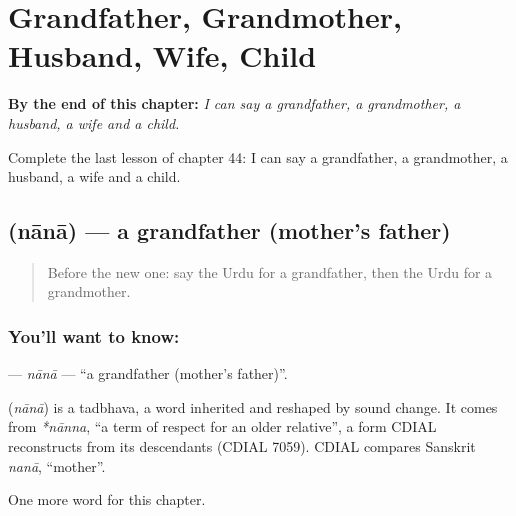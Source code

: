 
\chapter{Grandfather, Grandmother, Husband, Wife, Child}
\label{ch:ur-grandfather-grandmother-husband-wife-child}

\begin{chapteropening}
\textbf{By the end of this chapter:} \emph{I can say a grandfather, a grandmother, a husband, a wife and a child.}

Complete the last lesson of chapter 44: I can say a grandfather, a grandmother, a husband, a wife and a child.
\end{chapteropening}

\section[\texorpdfstring{\ur{نانا} (nānā)}{نانا (nānā)}]{ (nānā) — a grandfather (mother's father)}

\label{lesson:UR-C44-nana}



\begin{quote}
Before the new one: say the Urdu for a grandfather, then the Urdu for a grandmother.
\end{quote}

\subsection*{You'll want to know: }
\textbf{} — \emph{nānā} — \textquotedblleft{}a grandfather (mother's father)\textquotedblright{}.

\begin{cousinweb}
\textbf{} (\emph{nānā}) is a tadbhava, a word inherited and reshaped by sound change. It comes from \emph{*nānna}, \textquotedblleft{}a term of respect for an older relative\textquotedblright{}, a form CDIAL reconstructs from its descendants (CDIAL 7059). CDIAL compares Sanskrit \emph{nanā}, \textquotedblleft{}mother\textquotedblright{}.
\end{cousinweb}

\begin{grammarlens}[title={What you've built}]
One more word for this chapter.
\end{grammarlens}

